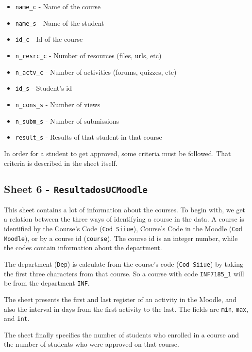 \begin{itemize}
    \item \texttt{name\_c} - Name of the course
    \item \texttt{name\_s} - Name of the student
    \item \texttt{id\_c} - Id of the course
    \item \texttt{n\_resrc\_c} - Number of resources (files, urls, etc)
    \item \texttt{n\_actv\_c} - Number of activities (forums, quizzes, etc)
    \item \texttt{id\_s} - Student's id
    \item \texttt{n\_cons\_s} - Number of views
    \item \texttt{n\_subm\_s} - Number of submissions
    \item \texttt{result\_s} - Results of that student in that course
\end{itemize}

In order for a student to get approved, some criteria must be followed. That
criteria is described in the sheet itself.

\subsection{Sheet 6 - \texttt{ResultadosUCMoodle}}

This sheet contains a lot of information about the courses. To begin with, we
get a relation between the three ways of identifying a course in the data. A
course is identified by the Course's Code (\texttt{Cod Siiue}), Course's Code
in the Moodle (\texttt{Cod Moodle}), or by a course id (\texttt{course}). The
course id is an integer number, while the codes contain information about the
department.

The department (\texttt{Dep}) is calculate from the course's code (\texttt{Cod
Siiue}) by taking the first three characters from that course. So a course with
code \texttt{INF7185\_1} will be from the department \texttt{INF}.

The sheet presents the first and last register of an activity in the Moodle,
and also the interval in days from the first activity to the last. The fields
are \texttt{min}, \texttt{max}, and \texttt{int}.

The sheet finally specifies the number of students who enrolled in a course and
the number of students who were approved on that course.

